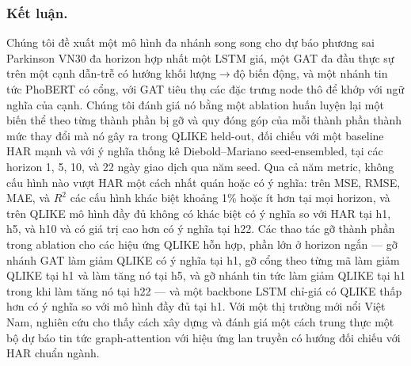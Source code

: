 \documentclass[runningheads]{llncs}
\begin{document}
\subsubsection{Kết luận.}
Chúng tôi đề xuất một mô hình đa nhánh song song cho dự báo phương sai Parkinson VN30 đa horizon hợp nhất
một LSTM giá, một GAT đa đầu thực sự trên một cạnh dẫn-trễ có hướng khối lượng$\to$độ biến động, và một
nhánh tin tức PhoBERT có cổng, với GAT tiêu thụ các đặc trưng node thô để khớp với ngữ nghĩa của cạnh.
Chúng tôi đánh giá nó bằng một ablation huấn luyện lại một biến thể theo từng thành phần bị gỡ và quy đóng
góp của mỗi thành phần thành mức thay đổi mà nó gây ra trong QLIKE held-out, đối chiếu với một baseline
HAR mạnh và với ý nghĩa thống kê Diebold--Mariano seed-ensembled, tại các horizon 1, 5, 10, và 22 ngày
giao dịch qua năm seed. Qua cả năm metric, không cấu hình nào vượt HAR một cách nhất quán hoặc có ý nghĩa:
trên MSE, RMSE, MAE, và $R^2$ các cấu hình khác biệt khoảng 1\% hoặc ít hơn tại mọi horizon, và trên
QLIKE mô hình đầy đủ không có khác biệt có ý nghĩa so với HAR tại h1, h5, và h10 và có giá trị cao hơn có
ý nghĩa tại h22. Các thao tác gỡ thành phần trong ablation cho các hiệu ứng QLIKE hỗn hợp, phần lớn ở
horizon ngắn --- gỡ nhánh GAT làm giảm QLIKE có ý nghĩa tại h1, gỡ cổng theo từng mã làm giảm QLIKE tại
h1 và làm tăng nó tại h5, và gỡ nhánh tin tức làm giảm QLIKE tại h1 trong khi làm tăng nó tại h22 --- và
một backbone LSTM chỉ-giá có QLIKE thấp hơn có ý nghĩa so với mô hình đầy đủ tại h1. Với một thị trường
mới nổi Việt Nam, nghiên cứu cho thấy cách xây dựng và đánh giá một cách trung thực một bộ dự báo tin tức
graph-attention với hiệu ứng lan truyền có hướng đối chiếu với HAR chuẩn ngành.
\end{document}
